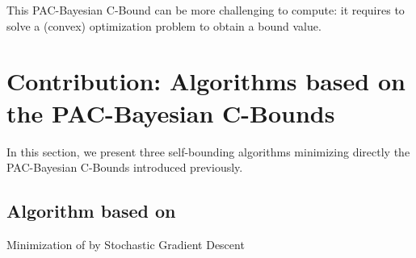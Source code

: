 This PAC-Bayesian C-Bound can be more challenging to compute: it requires to solve a (convex) optimization problem to obtain a bound value.

\section{Contribution: Algorithms based on the PAC-Bayesian C-Bounds}
\label{chap:mv:section:contribution}

In this section, we present three self-bounding algorithms minimizing directly the PAC-Bayesian C-Bounds introduced previously.

\subsection{Algorithm based on }

\label{chap:mv:section:contribution-mcallester}
\begin{algorithm}[H]
  \caption{Minimization of  by Stochastic Gradient Descent}
  \begin{algorithmic}
    \State{$\Q \leftarrow \P$}
    \EndFor
    \EndFor    
    \State{\Return{$\Q$}}
  \end{algorithmic}
  \label{chap:mv:algo:mcallester}
\end{algorithm}

